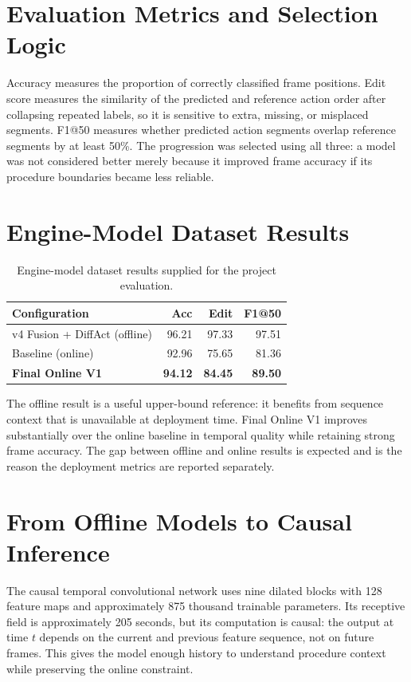 \section{Evaluation Metrics and Selection Logic}

Accuracy measures the proportion of correctly classified frame positions. Edit
score measures the similarity of the predicted and reference action order after
collapsing repeated labels, so it is sensitive to extra, missing, or misplaced
segments. F1@50 measures whether predicted action segments overlap reference
segments by at least 50\%. The progression was selected using all three: a
model was not considered better merely because it improved frame accuracy if
its procedure boundaries became less reliable.

\section{Engine-Model Dataset Results}

\begin{table}[H]
\centering
\small
\begin{tabularx}{\textwidth}{@{}Xrrr@{}}
\toprule
\textbf{Configuration} & \textbf{Acc} & \textbf{Edit} & \textbf{F1@50} \\
\midrule
v4 Fusion + DiffAct (offline) & 96.21 & 97.33 & 97.51 \\
Baseline (online) & 92.96 & 75.65 & 81.36 \\
\textbf{Final Online V1} & \textbf{94.12} & \textbf{84.45} & \textbf{89.50} \\
\bottomrule
\end{tabularx}
\caption{Engine-model dataset results supplied for the project evaluation.}
\label{tab:engine-results}
\end{table}

The offline result is a useful upper-bound reference: it benefits from
sequence context that is unavailable at deployment time. Final Online V1
improves substantially over the online baseline in temporal quality while
retaining strong frame accuracy. The gap between offline and online results is
expected and is the reason the deployment metrics are reported separately.

\section{From Offline Models to Causal Inference}

The causal temporal convolutional network uses nine dilated blocks with 128
feature maps and approximately 875 thousand trainable parameters. Its
receptive field is approximately 205 seconds, but its computation is causal:
the output at time $t$ depends on the current and previous feature sequence,
not on future frames. This gives the model enough history to understand
procedure context while preserving the online constraint.

